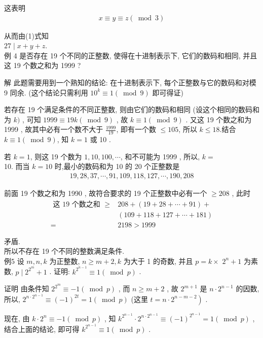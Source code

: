 	这表明
	\begin{align*}
		x \equiv y \equiv z(\bmod 3)
	\end{align*}

	从而由(1)式知\\
$27 \mid x+y+z$.\\
	例 4 是否存在 19 个不同的正整数, 使得在十进制表示下, 它们的数码和相同, 并且这 19 个数之和为 1999 ?

	解 此题需要用到一个熟知的结论: 在十进制表示下, 每个正整数与它的数码和对模 9 同余. (这个结论只需利用 $10^{k} \equiv 1(\bmod 9)$ 即可得证)

	若存在 19 个满足条件的不同正整数, 则由它们的数码和相同 (设这个相同的数码和为 $k)$ , 可知 $1999 \equiv 19 k(\bmod 9)$ , 故 $k \equiv 1(\bmod 9)$ . 又这 19 个数之和为 1999 , 故其中必有一个数不大于 $\frac{1999}{19}$, 即有一个数 $\leqslant 105$, 所以 $k \leqslant 18$.结合 $k \equiv 1(\bmod 9)$, 知 $k=1$ 或 10 .

	若 $k=1$, 则这 19 个数为 $1,10,100, \cdots$, 和不可能为 1999 , 所以, $k=$\\
	10. 而当 $k=10$ 时,最小的数码和为 10 的 20 个正整数是
	\begin{align*}
		19,28,37, \cdots, 91,109,118,127, \cdots, 190,208
	\end{align*}

	前面 19 个数之和为 1990 , 故符合要求的 19 个正整数中必有一个 $\geqslant 208$ , 此时\begin{align}
		\text { 这 } 19 \text { 个数之和 } \geqslant & 208+(19+28+\cdots+91)+   \\
		                                             & (109+118+127+\cdots+181) \\
		=                                            & 2198>1999
	\end{align}

	矛盾.\\
	所以不存在 19 个不同的整数满足条件.\\
	例5 设 $m ,  n ,  k$ 为正整数,  $n \geqslant m+2, k$ 为大于 1 的奇数, 并且 $p=k \times$ $2^{n}+1$ 为素数,  $p \mid 2^{2^{m}}+1$ . 证明:  $k^{2^{n-1}} \equiv 1(\bmod p)$ .

	证明 由条件知 $2^{2^{m}} \equiv-1(\bmod p)$ , 而 $n \geqslant m+2$ , 故 $2^{m+1}$ 是 $n \cdot 2^{n-1}$ 的因数, 所以,  $2^{n \cdot 2^{n-1}} \equiv(-1)^{2 t}=1(\bmod p)$ (这里 $\left.t=n \cdot 2^{n-m-2}\right)$ .

	现在, 由 $k \cdot 2^{n} \equiv-1(\bmod p)$ , 知 $k^{2^{n-1}} \cdot 2^{n \cdot 2^{n-1}} \equiv(-1)^{2^{n-1}}=1(\bmod p)$ , 结合上面的结论, 即可得 $k^{2^{n-1}} \equiv 1(\bmod p)$ .

